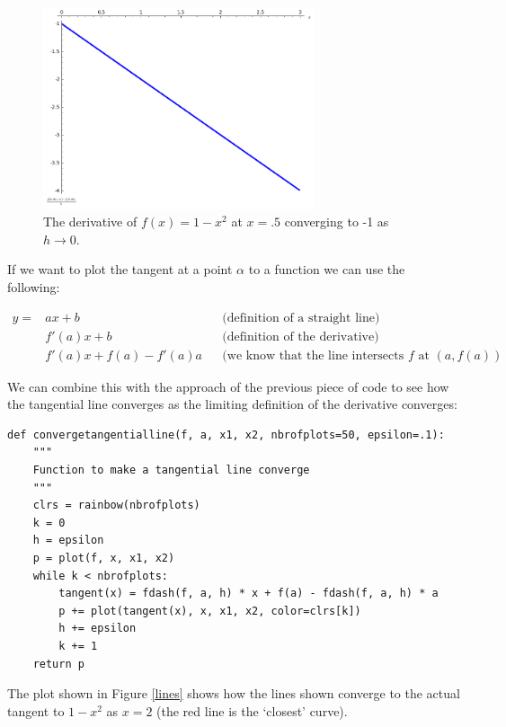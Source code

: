 \documentclass[a4paper]{article}
\theoremstyle{break}
\begin{document}
\begin{figure}[!htbp]
\begin{center}
\includegraphics[width=8cm]{sage1.png}
\end{center}
\caption{The derivative of $f(x)=1-x^2$ at $x=.5$ converging to -1 as $h\to0$.}
\end{figure}

If we want to plot the tangent at a point $\alpha$ to a function we can use the following:

\begin{align}
y=&ax+b&&\text{(definition of a straight line)}\nonumber\\
  &f'(a)x+b&&\text{(definition of the derivative)}\nonumber\\
  &f'(a)x+f(a)-f'(a)a&&\text{(we know that the line intersects $f$ at $(a,f(a))$}\nonumber
\end{align}

We can combine this with the approach of the previous piece of code to see how the tangential line converges as the limiting definition of the derivative converges:

\begin{verbatim}
def convergetangentialline(f, a, x1, x2, nbrofplots=50, epsilon=.1):
    """
    Function to make a tangential line converge
    """
    clrs = rainbow(nbrofplots)
    k = 0
    h = epsilon
    p = plot(f, x, x1, x2)
    while k < nbrofplots:
        tangent(x) = fdash(f, a, h) * x + f(a) - fdash(f, a, h) * a
        p += plot(tangent(x), x, x1, x2, color=clrs[k])
        h += epsilon
        k += 1
    return p
\end{verbatim}

The plot shown in Figure \ref{lines} shows how the lines shown converge to the actual tangent to $1-x^2$ as $x=2$ (the red line is the `closest' curve).
\end{document}
